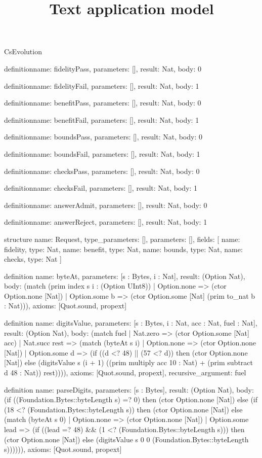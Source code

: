 \begin{lexlean}{CsEvolution}
\title{Text application model}
\begin{semanticmodule}
definition{name: fidelityPass, parameters: [], result: Nat, body: 0}

definition{name: fidelityFail, parameters: [], result: Nat, body: 1}

definition{name: benefitPass, parameters: [], result: Nat, body: 0}

definition{name: benefitFail, parameters: [], result: Nat, body: 1}

definition{name: boundsPass, parameters: [], result: Nat, body: 0}

definition{name: boundsFail, parameters: [], result: Nat, body: 1}

definition{name: checksPass, parameters: [], result: Nat, body: 0}

definition{name: checksFail, parameters: [], result: Nat, body: 1}

definition{name: answerAdmit, parameters: [], result: Nat, body: 0}

definition{name: answerReject, parameters: [], result: Nat, body: 1}

structure{
  name: Request,
  type_parameters: [],
  parameters: [],
  fields: [
    {name: fidelity, type: Nat},
    {name: benefit, type: Nat},
    {name: bounds, type: Nat},
    {name: checks, type: Nat}
  ]
}

definition{
  name: byteAt,
  parameters: [s : Bytes, i : Nat],
  result: (Option Nat),
  body: (match (prim index s i : (Option UInt8))
    | Option.none => (ctor Option.none [Nat])
    | Option.some b => (ctor Option.some [Nat] (prim to_nat b : Nat))),
  axioms: [Quot.sound, propext]
}

definition{
  name: digitsValue,
  parameters: [s : Bytes, i : Nat, acc : Nat, fuel : Nat],
  result: (Option Nat),
  body: (match fuel
    | Nat.zero => (ctor Option.some [Nat] acc)
    | Nat.succ rest => (match (byteAt s i)
      | Option.none => (ctor Option.none [Nat])
      | Option.some d => (if ((d <? 48) || (57 <? d)) then (ctor Option.none [Nat]) else (digitsValue s (i + 1) ((prim multiply acc 10 : Nat) + (prim subtract d 48 : Nat)) rest)))),
  axioms: [Quot.sound, propext],
  recursive_argument: fuel
}

definition{
  name: parseDigits,
  parameters: [s : Bytes],
  result: (Option Nat),
  body: (if ((Foundation.Bytes::byteLength s) =? 0) then (ctor Option.none [Nat]) else (if (18 <? (Foundation.Bytes::byteLength s)) then (ctor Option.none [Nat]) else (match (byteAt s 0)
    | Option.none => (ctor Option.none [Nat])
    | Option.some lead => (if ((lead =? 48) && (1 <? (Foundation.Bytes::byteLength s))) then (ctor Option.none [Nat]) else (digitsValue s 0 0 (Foundation.Bytes::byteLength s)))))),
  axioms: [Quot.sound, propext]
}


\end{semanticmodule}
\end{lexlean}
